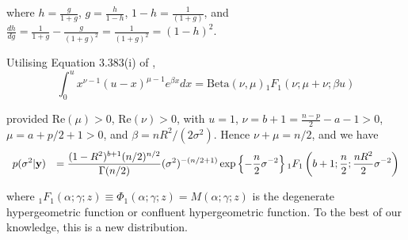 \documentclass{amsart}[12pt]
\newcommand{\mgc}[1]{{\color{blue}#1}}
\begin{document}

\noindent where
$h = \frac{g}{1+g}$,
$g = \frac{h}{1-h}$,
$1 - h = \frac{1}{(1 + g)}$,
and
$\frac{dh}{dg} = \frac{1}{1+g} - \frac{g}{(1 +g)^2} = \frac{1}{(1+g)^2} = (1 - h)^2$.

\noindent Utilising Equation 3.383(i) of \citep{Gradshteyn1988},
$$
\int_{0}^u x^{\nu - 1} (u - x)^{\mu - 1}  e^{\beta x} dx = \mbox{Beta}(\nu,\mu) {}_1 F_1(\nu;\mu+\nu;\beta u)
$$

\noindent provided $\mbox{Re}(\mu)>0$, $\mbox{Re}(\nu)>0$, with
$u = 1$, $\nu = b + 1 = \frac{n-p}{2} - a - 1 >0$, $\mu = a + p/2 + 1 >0$, and 
$\beta = nR^2/(2\sigma^2)$. Hence $\nu + \mu = n/2$, and we have
$$
\begin{array}{rl}
	\displaystyle p(\sigma^2|{\bf y}) 
	  & \displaystyle = \frac{(1 -  R^2)^{b+1} ( n/2)^{n/2}}{\Gamma(n/2)} 
	(\sigma^2)^{-(n/2 + 1)}\exp\left\{ -  \frac{n}{2} \sigma^{-2} \right\}  {}_1 F_1\left(
	b + 1; \frac{n}{2}; \frac{nR^2}{2} \sigma^{-2} \right)
\end{array}
$$

\noindent where ${}_1 F_1(\alpha;\gamma;z) \equiv \Phi_1(\alpha;\gamma;z) = M(\alpha;\gamma;z)$ 
is the
degenerate hypergeometric function or
confluent hypergeometric function. To the best of our knowledge, this is a new distribution.







\end{document}
